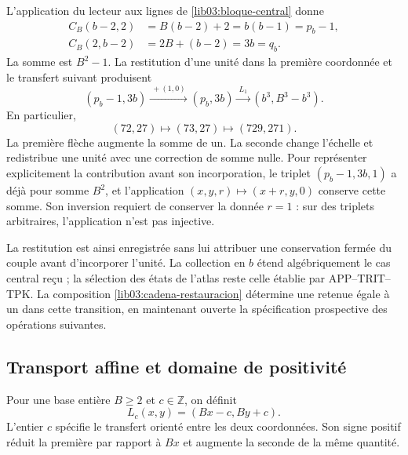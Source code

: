 L’application du lecteur aux lignes de \eqref{lib03:bloque-central} donne
\begin{align}
 C_B(b-2,2)&=B(b-2)+2=b(b-1)=p_b-1,\\
 C_B(2,b-2)&=2B+(b-2)=3b=q_b.
 \label{lib03:concatenaciones}
\end{align}
La somme est \(B^2-1\). La restitution d'une unité dans la première coordonnée et le transfert suivant produisent
\begin{equation}
 (p_b-1,3b)\xrightarrow{\ +(1,0)\ }(p_b,3b)
 \xrightarrow{\ L_1\ }(b^3,B^3-b^3).
 \label{lib03:cadena-restauracion}
\end{equation}
En particulier,
\begin{equation}
 (72,27)\longmapsto(73,27)\longmapsto(729,271).
 \label{lib03:cadena-central}
\end{equation}
La première flèche augmente la somme de un. La seconde change l’échelle
et redistribue une unité avec une correction de somme nulle. Pour représenter
explicitement la contribution avant son incorporation, le triplet
\((p_b-1,3b,1)\) a déjà pour somme \(B^2\), et l’application
\((x,y,r)\mapsto(x+r,y,0)\) conserve cette somme. Son inversion requiert de
conserver la donnée \(r=1\) : sur des triplets arbitraires, l’application n’est
pas injective.

La restitution est ainsi enregistrée sans lui attribuer une conservation
fermée du couple avant d’incorporer l’unité. La collection en \(b\)
étend algébriquement le cas central reçu ; la sélection des
états de l’atlas reste celle établie par APP--TRIT--TPK.
La composition \eqref{lib03:cadena-restauracion} détermine une retenue
égale à un dans cette transition, en maintenant ouverte la spécification
prospective des opérations suivantes.

\subsection{Transport affine et domaine de positivité}
\label{lib03:afin}

\begin{definition}
\label{lib03:def-transporte}
Pour une base entière \(B\geq2\) et \(c\in\mathbb Z\), on définit
\begin{equation}
 L_c(x,y)=(Bx-c,By+c).
 \label{lib03:lc}
\end{equation}
L’entier \(c\) spécifie le transfert orienté entre les deux
coordonnées. Son signe positif réduit la première par rapport à \(Bx\)
et augmente la seconde de la même quantité.
\end{definition}

